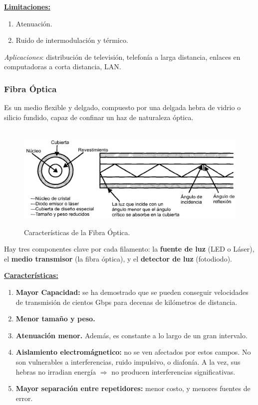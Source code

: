 \documentclass[10pt,a4paper]{article}
\begin{document}
\underline{\textbf{Limitaciones:}}
\begin{enumerate}[+]
\item Atenuación.
\item Ruido de intermodulación y térmico.
\end{enumerate}

\textit{Aplicaciones}: distribución de televisión, telefonía a larga distancia, enlaces en computadoras a corta distancia, LAN.

\subsubsection{Fibra Óptica}

Es un medio flexible y delgado, compuesto por una delgada hebra de vidrio o silicio fundido, capaz de confinar un haz de naturaleza óptica.

\begin{figure}[ht!]
  \caption{Características de la Fibra Óptica.}
  \label{fig:fibra_optica}  
  \centering
  \hbox{
	\includegraphics[width=\textwidth-\fboxrule-\fboxrule]{imgs/fibra_optica.png}}
\end{figure}

Hay tres componentes clave por cada filamento: la \textbf{fuente de luz} (LED o Láser), el \textbf{medio transmisor} (la fibra óptica), y el \textbf{detector de luz} (fotodiodo).

\underline{\textbf{Características:}}
\begin{enumerate}[+]
\item \textbf{Mayor Capacidad:} se ha demostrado que se pueden conseguir velocidades de transmisión de cientos Gbps para decenas de kilómetros de distancia.
\item \textbf{Menor tamaño y peso.}
\item \textbf{Atenuación menor.} Además, es constante a lo largo de un gran intervalo.
\item \textbf{Aislamiento electromágnetico:} no se ven afectados por estos campos. No son vulnerables a interferencias, ruido impulsivo, o diafonía. A la vez, sus hebras no irradian energía $\Rightarrow$ no producen interferencias significativas.
\item \textbf{Mayor separación entre repetidores:} menor costo, y menores fuentes de error.
\end{enumerate}
\end{document}
